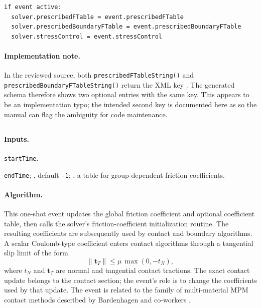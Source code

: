 \begin{lstlisting}[caption={DeformationUpdate event pseudocode.}]
if event active:
  solver.prescribedFTable = event.prescribedFTable
  solver.prescribedBoundaryFTable = event.prescribedBoundaryFTable
  solver.stressControl = event.stressControl
\end{lstlisting}

\paragraph{Implementation note.}
In the reviewed source, both \texttt{prescribedFTableString()} and \texttt{prescribedBoundaryFTableString()} return the XML key .  The generated schema therefore shows two optional entries with the same key.  This appears to be an implementation typo; the intended second key is documented here as  so the manual can flag the ambiguity for code maintenance.

\subsection{}
\label{subsec:event-friction-coefficient-swap}

\paragraph{Inputs.}
\begin{description}[leftmargin=*,style=nextline]
\item[\textbf{Required.}] \texttt{startTime}.
\item[\textbf{Optional.}] \texttt{endTime}; , default \texttt{-1}; , a table for group-dependent friction coefficients.
\end{description}

\paragraph{Algorithm.}
This one-shot event updates the global friction coefficient and optional coefficient table, then calls the solver's friction-coefficient initialization routine.  The resulting coefficients are subsequently used by contact and boundary algorithms.  A scalar Coulomb-type coefficient enters contact algorithms through a tangential slip limit of the form
\begin{equation}
  \|\mathbf{t}_T\| \le \mu\,\max(0,-t_N),
  \label{eq:coulomb-limit}
\end{equation}
where $t_N$ and $\mathbf{t}_T$ are normal and tangential contact tractions.  The exact contact update belongs to the contact section; the event's role is to change the coefficients used by that update.  The event is related to the family of multi-material MPM contact methods described by Bardenhagen and co-workers \cite{bardenhagen2001contact,bardenhagen2000granular}.

